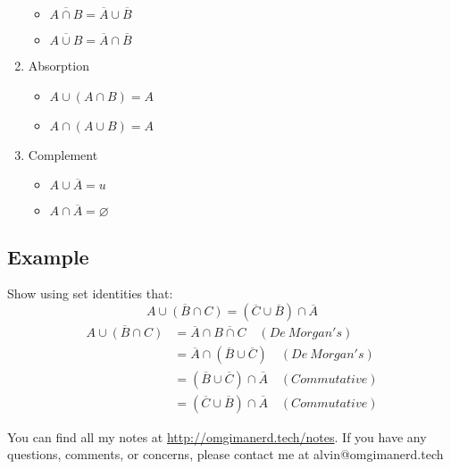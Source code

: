 \documentclass{math}
\begin{document}
\begin{enumerate}
  \begin{itemize}
    \item \( \overline{A \cap B} = \overline{A} \cup \overline{B} \)
    \item \( \overline{A \cup B} = \overline{A} \cap \overline{B} \)
  \end{itemize}
  \item Absorption
  \begin{itemize}
    \item \( A \cup (A \cap B) = A \)
    \item \( A \cap (A \cup B) = A \)
  \end{itemize}
  \item Complement
  \begin{itemize}
    \item \( A \cup \overline{A} = u \)
    \item \( A \cap \overline{A} = \varnothing \)
  \end{itemize}
\end{enumerate}

\subsection*{Example}
Show using set identities that:
\[ \overline{A \cup (B \cap C)} = (\overline{C} \cup \overline{B}) \cap
   \overline{A} \]
\begin{align*}
  \overline{A \cup (B \cap C)} &=
    \overline{A} \cap \overline{B \cap C} \quad (De\ Morgan's) \\
  &= \overline{A} \cap (\overline{B} \cup \overline{C}) \quad (De\ Morgan's) \\
  &= (\overline{B} \cup \overline{C}) \cap \overline{A} \quad (Commutative) \\
  &= (\overline{C} \cup \overline{B}) \cap \overline{A} \quad (Commutative)
\end{align*}

\begin{center}
  You can find all my notes at \url{http://omgimanerd.tech/notes}. If you have
  any questions, comments, or concerns, please contact me at
  alvin@omgimanerd.tech
\end{center}
\end{document}
